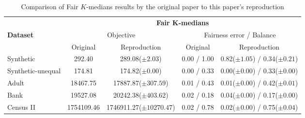 \begin{table}[H]
    \centering
    \begin{tabular}{|l|c|c|c|c|}
        \hline
            & \multicolumn{4}{c|}{\textbf{Fair $\boldsymbol{K}$-medians}} \\
            \cline{2-5}
        \textbf{Dataset} & \multicolumn{2}{c|}{Objective} &   \multicolumn{2}{c|}{Fairness error / Balance} \\ \cline{2-5}
        & Original & Reproduction & Original & Reproduction \\
        \hline
        Synthetic & 292.40 & 289.08($\pm 2.03$) & \color{orange}0.00\color{black} / \color{red}1.00\color{black} & 0.82($\pm 1.05$) / 0.34($\pm 0.21$) \\
        Synthetic-unequal & 174.81 & 174.82($\pm 0.00$) & 0.00 / 0.33 & 0.00($\pm 0.00$) / 0.33($\pm 0.00$) \\
        Adult & 18467.75 & 17887.87($\pm 307.59$) & 0.01 / \color{red}0.43\color{black} & 0.01($\pm 0.00$) / 0.42($\pm 0.01$) \\
        Bank & \color{red}19527.08\color{black} & 20242.38($\pm 403.62$) & \color{red}0.02\color{black} / \color{red}0.18\color{black} & 0.04($\pm 0.00$) / 0.17($\pm 0.00$) \\
        Census II & 1754109.46 & 1746911.27($\pm 10270.47$) & 0.02 / \color{orange}0.78\color{black} & 0.02($\pm 0.00$) / 0.75($\pm 0.04$) \\
        \hline
    \end{tabular}
    \caption{Comparison of Fair $K$-medians results by the original paper to this paper's reproduction}
    \label{tab:comparison_originalVSreproduction_kmedian}
\end{table}

